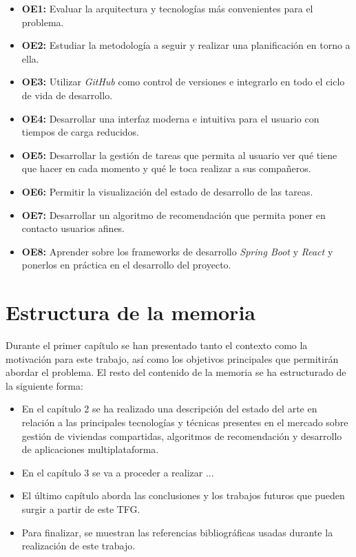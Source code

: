 \begin{itemize}
    \item \textbf{OE1:} Evaluar la arquitectura y tecnologías más convenientes para el problema.
    \item \textbf{OE2:} Estudiar la metodología a seguir y realizar una planificación en torno a ella.
    \item \textbf{OE3:} Utilizar \emph{GitHub} \cite{GitHub} como control de versiones e integrarlo en todo el ciclo de vida de desarrollo.
    \item \textbf{OE4:} Desarrollar una interfaz moderna e intuitiva para el usuario con tiempos de carga reducidos.
    \item \textbf{OE5:} Desarrollar la gestión de tareas que permita al usuario ver qué tiene que hacer en cada momento y qué le toca realizar a sus compañeros.
    \item \textbf{OE6:} Permitir la visualización del estado de desarrollo de las tareas.
    \item \textbf{OE7:} Desarrollar un algoritmo de recomendación que permita poner en contacto usuarios afines.
    \item \textbf{OE8:} Aprender sobre los frameworks de desarrollo \emph{Spring Boot} \cite{SpringBoot} y \emph{React} \cite{React} y ponerlos en práctica en el desarrollo del proyecto.
\end{itemize}

\section{Estructura de la memoria}
Durante el primer capítulo se han presentado tanto el contexto como la motivación para este trabajo, así como los objetivos principales que permitirán abordar el problema. El resto del contenido de la memoria se ha estructurado de la siguiente forma:

\begin{itemize}
    \item En el capítulo 2 se ha realizado una descripción del estado del arte en relación a las principales tecnologías y técnicas presentes en el mercado sobre gestión de viviendas compartidas, algoritmos de recomendación y desarrollo de aplicaciones multiplataforma.
    \item En el capítulo 3 se va a proceder a realizar ...
    \item El último capítulo aborda las conclusiones y los trabajos futuros que pueden surgir a partir de este TFG.
    \item Para finalizar, se muestran las referencias bibliográficas usadas durante la realización de este trabajo.
\end{itemize}
